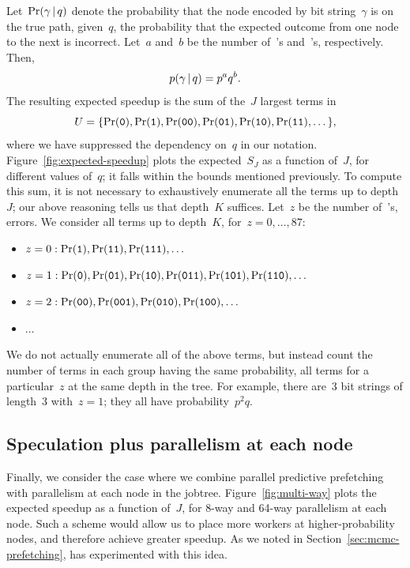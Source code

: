 \documentclass[angelino.tex]{subfiles}
\begin{document}
Let~${\Pr(\gamma \,|\, q)}$ denote the probability that the node encoded by
bit string~$\gamma$ is on the true path, given~$q$, the probability that the
expected outcome from one node to the next is incorrect.
Let~$a$ and~$b$ be the number of~'s and~'s, respectively.
Then,
\[
p(\gamma \,|\, q) = p^a q^b.
\]
The resulting expected speedup is the sum of the~$J$ largest terms in
\[
U = \{\Pr(\texttt{0}), \Pr(\texttt{1}), 
\Pr(\texttt{00}), \Pr(\texttt{01}), \Pr(\texttt{10}), \Pr(\texttt{11}), \dots\},
\]
where we have suppressed the dependency on~$q$ in our notation.
Figure~\ref{fig:expected-speedup} plots the expected~$S_J$ as a function of~$J$,
for different values of~$q$; it falls within the bounds mentioned previously.
To compute this sum, it is not necessary to exhaustively enumerate all the terms
up to depth~$J$; our above reasoning tells us that depth~$K$ suffices.
Let~$z$ be the number of~'s, \ie errors. 
We consider all terms up to depth~$K$, for~${z=0, \dots, 87}$:
%
\begin{itemize}
\item $z=0: \Pr(\texttt{1}), \Pr(\texttt{11}), \Pr(\texttt{111}), \dots$
\item $z=1: \Pr(\texttt{0}), \Pr(\texttt{01}), \Pr(\texttt{10}), 
	\Pr(\texttt{011}), \Pr(\texttt{101}), \Pr(\texttt{110}), \dots$
\item $z=2: \Pr(\texttt{00}), \Pr(\texttt{001}), \Pr(\texttt{010}), \Pr(\texttt{100}), \dots$
\item $\dots$
\end{itemize}
%
We do not actually enumerate all of the above terms, but instead count
the number of terms in each group having the same probability,
\ie all terms for a particular~$z$ at the same depth in the tree.
For example, there are~3 bit strings of length~3 with~${z=1}$;
they all have probability~$p^2q$.

\subsection{Speculation plus parallelism at each node}
\label{sec:multi-way}

Finally, we consider the case where we combine parallel predictive prefetching
with parallelism at each node in the jobtree.
Figure~\ref{fig:multi-way} plots the expected speedup as a function of~$J$,
for 8-way and 64-way parallelism at each node.
Such a scheme would allow us to place more workers at higher-probability nodes,
and therefore achieve greater speedup.
As we noted in Section~\ref{sec:mcmc-prefetching},
\citet{strid-2010-prefetching} has experimented with this idea.
\end{document}
